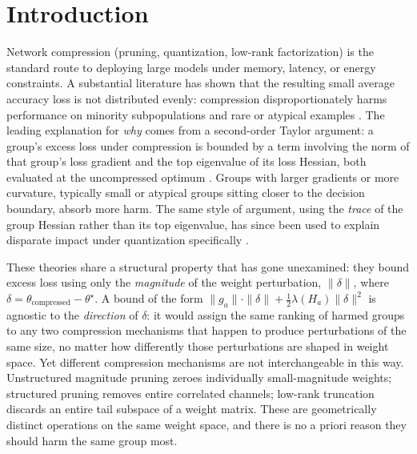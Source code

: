 \documentclass{article}
\newcommand{\theorig}{\theta^\star}
\begin{document}
\section{Introduction}
\label{sec:intro}

Network compression (pruning, quantization, low-rank factorization) is the standard route to deploying large models under memory, latency, or energy constraints. A substantial literature has shown that the resulting small average accuracy loss is not distributed evenly: compression disproportionately harms performance on minority subpopulations and rare or atypical examples \citep{hooker2020characterising,tran2022pruning,iofinova2023bias}. The leading explanation for \emph{why} comes from a second-order Taylor argument: a group's excess loss under compression is bounded by a term involving the norm of that group's loss gradient and the top eigenvalue of its loss Hessian, both evaluated at the uncompressed optimum \citep{tran2022pruning}. Groups with larger gradients or more curvature, typically small or atypical groups sitting closer to the decision boundary, absorb more harm. The same style of argument, using the \emph{trace} of the group Hessian rather than its top eigenvalue, has since been used to explain disparate impact under quantization specifically \citep{liu2025understanding,bellam2024causes,bellam2025explaining}.

These theories share a structural property that has gone unexamined: they bound excess loss using only the \emph{magnitude} of the weight perturbation, $\|\delta\|$, where $\delta = \theta_{\text{compressed}} - \theorig$. A bound of the form $\|g_a\| \cdot \|\delta\| + \tfrac{1}{2}\lambda(H_a)\|\delta\|^2$ is agnostic to the \emph{direction} of $\delta$: it would assign the same ranking of harmed groups to any two compression mechanisms that happen to produce perturbations of the same size, no matter how differently those perturbations are shaped in weight space. Yet different compression mechanisms are not interchangeable in this way. Unstructured magnitude pruning zeroes individually small-magnitude weights; structured pruning removes entire correlated channels; low-rank truncation discards an entire tail subspace of a weight matrix. These are geometrically distinct operations on the same weight space, and there is no a priori reason they should harm the same group most.
\end{document}
